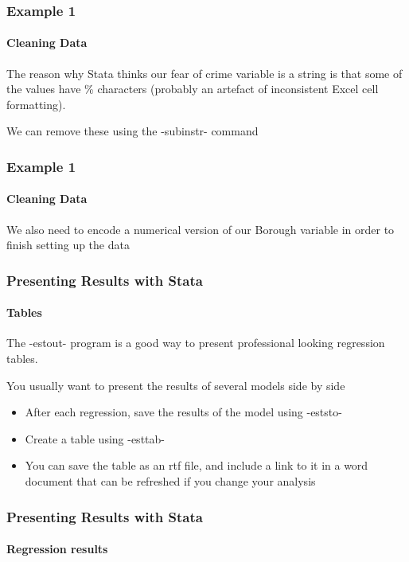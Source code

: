 \documentclass{beamer}
\begin{document}
\begin{frame}
  \frametitle{Example 1}
  \framesubtitle{Cleaning Data}
The reason why Stata thinks our fear of crime variable is a string is that some of the values have \% characters (probably an artefact of inconsistent Excel cell formatting).

\smallskip

We can remove these using the -subinstr- command


\end{frame}


\begin{frame}
  \frametitle{Example 1}
  \framesubtitle{Cleaning Data}
We also need to encode a numerical version of our Borough variable in order to finish setting up the data 



\end{frame}


\begin{frame}
  \frametitle{Presenting Results with Stata}
  \framesubtitle{Tables}
The -estout- program is a good way to present professional looking regression tables.

\medskip

You usually want to present the results of several models side by side
  \begin{itemize}
    \item After each regression, save the results of the model using -eststo-
    \item Create a table using -esttab-
    \item You can save the table as an rtf file, and include a link to it in a word document that can be refreshed if you change your analysis
  \end{itemize}
\end{frame}



\begin{frame}
  \frametitle{Presenting Results with Stata}
  \framesubtitle{Regression results}

\begin{columns}[onlytextwidth]
  \begin{column}{6cm}


\normalsize

  \end{column}
  \begin{column}{6cm}

  \end{column}
\end{columns}

\end{frame}
\end{document}
